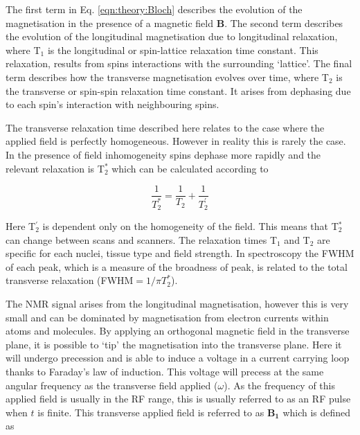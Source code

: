 The first term in Eq. \ref{eqn:theory:Bloch} describes the evolution of the magnetisation in the presence of a magnetic field $\mathbf{B}$. The second term describes the evolution of the longitudinal magnetisation due to longitudinal relaxation, where T$_1$ is the longitudinal or spin-lattice relaxation time constant. This relaxation, results from spins interactions with the surrounding `lattice'. The final term describes how the transverse magnetisation evolves over time, where T$_2$ is the transverse or spin-spin relaxation time constant. It arises from dephasing due to each spin's interaction with neighbouring spins. 

The transverse relaxation time described here relates to the case where the applied field is perfectly homogeneous. However in reality this is rarely the case. In the presence of field inhomogeneity spins dephase more rapidly and the relevant relaxation is T$_2^*$ which can be calculated according to

\begin{equation}
    \frac{1}{T_2^*} = \frac{1}{T_2} + \frac{1}{T_2^{'}}
    \label{eqn:theory:trans}
\end{equation}

Here T$_2^{'}$ is dependent only on the homogeneity of the field. This means that T$_2^*$ can change between scans and scanners. The relaxation times T$_1$ and T$_2$ are specific for each nuclei, tissue type and field strength. In spectroscopy the \ac{FWHM} of each peak, which is a measure of the broadness of peak, is related to the total transverse relaxation (\ac{FWHM}$ = 1 / \pi T_2^*$). 


The \ac{NMR} signal arises from the longitudinal magnetisation, however this is very small and can be dominated by magnetisation from electron currents within atoms and molecules. By applying an orthogonal magnetic field in the transverse plane, it is possible to `tip' the magnetisation into the transverse plane. Here it will undergo precession and is able to induce a voltage in a current carrying loop thanks to Faraday's law of induction. This voltage will precess at the same angular frequency as the transverse field applied ($\omega$). As the frequency of this applied field is usually in the \ac{RF} range, this is usually referred to as an \ac{RF} pulse when $t$ is finite. This transverse applied field is referred to as $\mathbf{B_1}$ which is defined as

